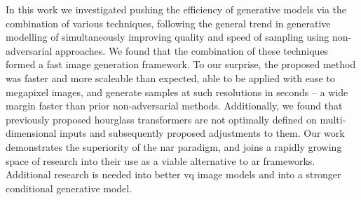 In this work we investigated pushing the efficiency of generative models via the
combination of various techniques, following the general trend in generative
modelling of simultaneously improving quality and speed of sampling using
non-adversarial approaches. We found that the combination of these techniques
formed a fast image generation framework. To our surprise, the proposed method
was faster and more scaleable than expected, able to be applied with ease to
megapixel images, and generate samples at such resolutions in seconds -- a wide
margin faster than prior non-adversarial methods. Additionally, we found that
previously proposed hourglass transformers are not optimally defined on
multi-dimensional inputs and subsequently proposed adjustments to them. Our work
demonstrates the superiority of the \acrlong{nar} paradigm, and joins a rapidly
growing space of research into their use as a viable alternative to \acrlong{ar}
frameworks. Additional research is needed into better \gls{vq} image models and
into a stronger conditional generative model.
